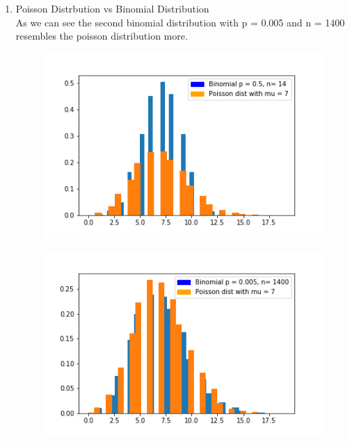 \documentclass[12pt]{article}
\begin{document}
\begin{enumerate}
\begin{enumerate}
\begin{enumerate}
        \item Poisson Distrbution vs Binomial Distribution 
        \\
        As we can see the second binomial distribution with p = 0.005 and n = 1400 resembles the poisson distribution more.
        \begin{figure}
            \centering
            \begin{minipage}{.5\textwidth}
              \centering
              \includegraphics[width=1\linewidth]{B1vsP.png}
              \label{fig:test1}
            \end{minipage}%
            \begin{minipage}{.5\textwidth}
              \centering
              \includegraphics[width=1\linewidth]{B2vsP.png}
              \label{fig:test2}
            \end{minipage}
            \end{figure}
           

\end{enumerate}
\end{enumerate}
\end{enumerate}
\end{document}
